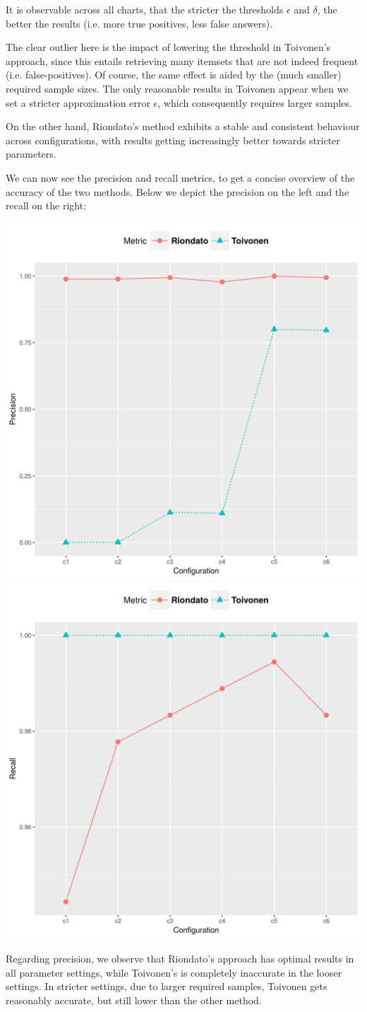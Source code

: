 \documentclass[11pt]{sigplanconf}
\begin{document}
It is observable across all charts, that the stricter the thresholds $\epsilon$ and $\delta$, the better the results (i.e. more true positives, less false answers).

The clear outlier here is the impact of lowering the threshold in Toivonen's approach, since this entails retrieving many itemsets that are not indeed frequent (i.e. false-positives). Of course, the same effect is aided by the (much smaller) required sample sizes. The only reasonable results in Toivonen appear when we set a stricter approximation error $\epsilon$, which consequently requires larger samples.

On the other hand, Riondato's method exhibits a stable and consistent behaviour across configurations, with results getting increasingly better towards stricter parameters.

We can now see the precision and recall metrics, to get a concise overview of the accuracy of the two methods. Below we depict the precision on the left and the recall on the right:

\begin{center}
\includegraphics[width=.45\columnwidth]{T40I10D100K.dat/precision.png}
\includegraphics[width=.45\columnwidth]{T40I10D100K.dat/recall.png}
\end{center}

Regarding precision, we observe that Riondato's approach has optimal results in all parameter settings, while Toivonen's is completely inaccurate in the looser settings. In stricter settings, due to larger required samples, Toivonen gets reasonably accurate, but still lower than the other method.
\end{document}
